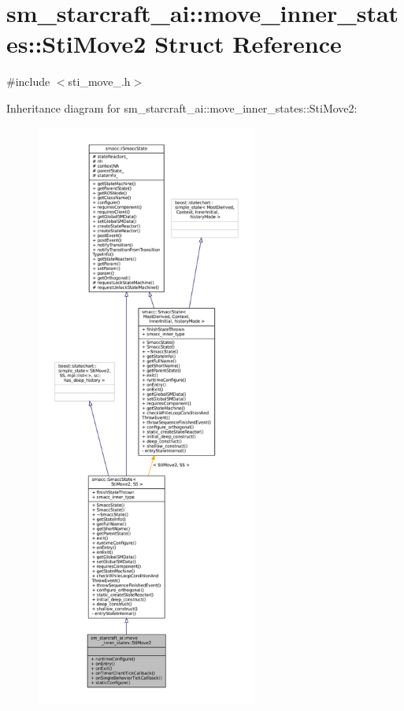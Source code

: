 \hypertarget{structsm__starcraft__ai_1_1move__inner__states_1_1StiMove2}{}\section{sm\+\_\+starcraft\+\_\+ai\+:\+:move\+\_\+inner\+\_\+states\+:\+:Sti\+Move2 Struct Reference}
\label{structsm__starcraft__ai_1_1move__inner__states_1_1StiMove2}


{\ttfamily \#include $<$sti\+\_\+move\+\_.\+h$>$}



Inheritance diagram for sm\+\_\+starcraft\+\_\+ai\+:\+:move\+\_\+inner\+\_\+states\+:\+:Sti\+Move2\+:
\nopagebreak
\begin{figure}[H]
\begin{center}
\leavevmode
\includegraphics[height=550pt]{structsm__starcraft__ai_1_1move__inner__states_1_1StiMove2__inherit__graph}
\end{center}
\end{figure}


